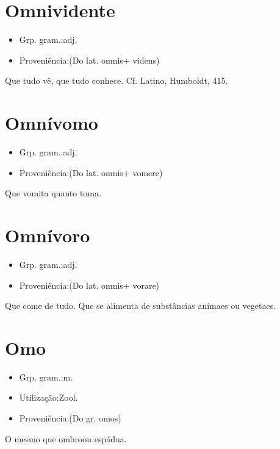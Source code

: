 \section{Omnividente}
\begin{itemize}
\item {Grp. gram.:adj.}
\end{itemize}
\begin{itemize}
\item {Proveniência:(Do lat. \textunderscore omnis\textunderscore  + \textunderscore videns\textunderscore )}
\end{itemize}
Que tudo vê, que tudo conhece. Cf. Latino, \textunderscore Humboldt\textunderscore , 415.
\section{Omnívomo}
\begin{itemize}
\item {Grp. gram.:adj.}
\end{itemize}
\begin{itemize}
\item {Proveniência:(Do lat. \textunderscore omnis\textunderscore  + \textunderscore vomere\textunderscore )}
\end{itemize}
Que vomita quanto toma.
\section{Omnívoro}
\begin{itemize}
\item {Grp. gram.:adj.}
\end{itemize}
\begin{itemize}
\item {Proveniência:(Do lat. \textunderscore omnis\textunderscore  + \textunderscore vorare\textunderscore )}
\end{itemize}
Que come de tudo.
Que se alimenta de substâncias animaes ou vegetaes.
\section{Omo}
\begin{itemize}
\item {Grp. gram.:m.}
\end{itemize}
\begin{itemize}
\item {Utilização:Zool.}
\end{itemize}
\begin{itemize}
\item {Proveniência:(Do gr. \textunderscore omos\textunderscore )}
\end{itemize}
O mesmo que \textunderscore ombro\textunderscore  ou \textunderscore espádua\textunderscore .

